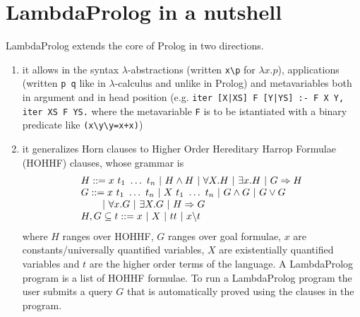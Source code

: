 \documentclass[preprint]{sigplanconf}
\begin{document}
\section{LambdaProlog in a nutshell}
LambdaProlog extends the core of Prolog in two directions.
\begin{enumerate}
\item it allows in the syntax $\lambda$-abstractions (written \verb+x\p+ for $\lambda x.p$), applications (written \verb+p q+ like in $\lambda$-calculus and unlike in Prolog) and metavariables both in argument and in head position (e.g. \verb+iter [X|XS] F [Y|YS] :- F X Y, iter XS F YS.+ where the metavariable \verb+F+ is to be istantiated with a binary predicate like \verb,(x\y\y=x+x),)
\item it generalizes Horn clauses to Higher Order Hereditary Harrop Formulae (HOHHF) clauses, whose grammar is
$$\begin{array}{l}
H ::= x~t_1~\ldots~t_n ~|~ H \wedge H ~|~ \forall X.H ~|~ \exists x.H ~|~ G \Rightarrow H\\
G ::= x~t_1~\ldots~t_n ~|~ X~t_1~\ldots~t_n ~|~ G \wedge G ~|~ G \vee G\\
 \hspace{0.65cm} ~|~ \forall x.G ~|~ \exists X.G ~|~ H \Rightarrow G\\
H,G \subseteq t ::= x ~|~ X ~|~ tt ~|~ x\backslash t
\end{array}$$
where $H$ ranges over HOHHF, $G$ ranges over goal formulae, $x$ are constants/universally quantified variables, $X$ are existentially quantified variables and $t$ are the higher order terms of the language. A LambdaProlog program is a list of HOHHF formulae. To run a LambdaProlog program the user submits a query $G$ that is automatically proved using the clauses in the program.
\end{enumerate}
\end{document}
